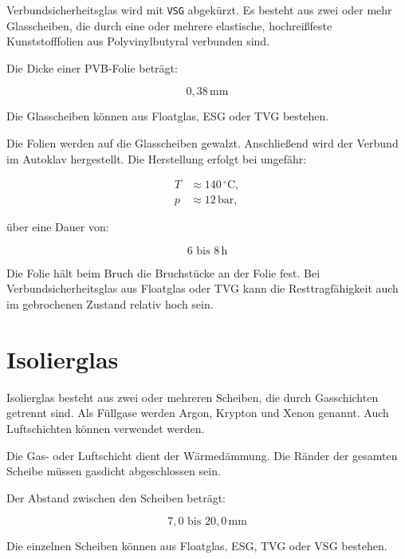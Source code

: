 \documentclass[
  12pt,
  a4paper,
  oneside
]{scrreprt}
\begin{document}
Verbundsicherheitsglas wird mit \texttt{VSG} abgekürzt. Es besteht aus
zwei oder mehr Glasscheiben, die durch eine oder mehrere elastische,
hochreißfeste Kunststofffolien aus Polyvinylbutyral verbunden sind.


Die Dicke einer PVB-Folie beträgt:

\begin{equation}
  0{,}38\,\mathrm{mm}
\end{equation}



Die Glasscheiben können aus Floatglas, ESG oder TVG bestehen.


Die Folien werden auf die Glasscheiben gewalzt. Anschließend wird der
Verbund im Autoklav hergestellt. Die Herstellung erfolgt bei ungefähr:

\begin{align}
  T &\approx 140\,^\circ\mathrm{C}, \\
  p &\approx 12\,\mathrm{bar},
\end{align}

über eine Dauer von:

\begin{equation}
  6 \text{ bis } 8\,\mathrm{h}
\end{equation}



Die Folie hält beim Bruch die Bruchstücke an der Folie fest. Bei
Verbundsicherheitsglas aus Floatglas oder TVG kann die Resttragfähigkeit
auch im gebrochenen Zustand relativ hoch sein. 

\section{Isolierglas}

Isolierglas besteht aus zwei oder mehreren Scheiben, die durch
Gasschichten getrennt sind. Als Füllgase werden Argon, Krypton und
Xenon genannt. Auch Luftschichten können verwendet werden.


Die Gas- oder Luftschicht dient der Wärmedämmung. Die Ränder der
gesamten Scheibe müssen gasdicht abgeschlossen sein. 

Der Abstand zwischen den Scheiben beträgt:

\begin{equation}
  7{,}0 \text{ bis } 20{,}0\,\mathrm{mm}
\end{equation}



Die einzelnen Scheiben können aus Floatglas, ESG, TVG oder VSG
bestehen. 
\end{document}
